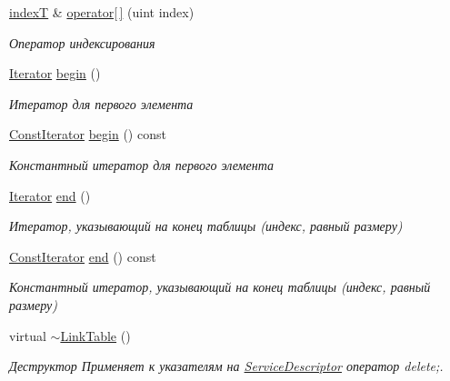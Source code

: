 \begin{DoxyCompactItemize}
\hyperlink{class_network_service_1_1_link_table_a5a0e870806128a79b9947a7ea496fe9e}{index\+T} \& \hyperlink{class_network_service_1_1_link_table_a04e0f13392aff39df1a0847d7667dccd}{operator\mbox{[}$\,$\mbox{]}} (uint index)
\begin{DoxyCompactList}\small\item\em Оператор индексирования \end{DoxyCompactList}\item 
\hyperlink{class_network_service_1_1_link_table_a699ed11fe42478b5269f8c44f7354c77}{Iterator} \hyperlink{class_network_service_1_1_link_table_a72c88d96a4a03fb9dd609df858dac1e6}{begin} ()
\begin{DoxyCompactList}\small\item\em Итератор для первого элемента \end{DoxyCompactList}\item 
\hyperlink{class_network_service_1_1_link_table_a2414daadb1745ec3039bba9810c8a23d}{Const\+Iterator} \hyperlink{class_network_service_1_1_link_table_a0a9a5b10b8a3613ee910d773cff8e272}{begin} () const 
\begin{DoxyCompactList}\small\item\em Константный итератор для первого элемента \end{DoxyCompactList}\item 
\hyperlink{class_network_service_1_1_link_table_a699ed11fe42478b5269f8c44f7354c77}{Iterator} \hyperlink{class_network_service_1_1_link_table_a775b722d34f014953289f7ad069a4567}{end} ()
\begin{DoxyCompactList}\small\item\em Итератор, указывающий на конец таблицы (индекс, равный размеру) \end{DoxyCompactList}\item 
\hyperlink{class_network_service_1_1_link_table_a2414daadb1745ec3039bba9810c8a23d}{Const\+Iterator} \hyperlink{class_network_service_1_1_link_table_a0f21f008e79a83eda18c23c8a416b7c0}{end} () const 
\begin{DoxyCompactList}\small\item\em Константный итератор, указывающий на конец таблицы (индекс, равный размеру) \end{DoxyCompactList}\item 
virtual \hyperlink{class_network_service_1_1_link_table_a4ea276d8834a25c4ed1872f96b324e22}{$\sim$\+Link\+Table} ()
\begin{DoxyCompactList}\small\item\em Деструктор Применяет к указателям на \hyperlink{class_network_service_1_1_service_descriptor}{Service\+Descriptor} оператор delete;. \end{DoxyCompactList}\end{DoxyCompactItemize}
